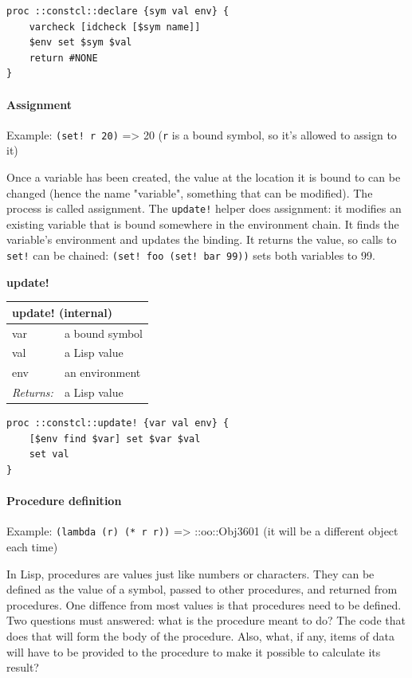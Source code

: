 \documentclass[twoside,9pt]{report}
\begin{document}
\noindent\makebox[\linewidth]{\rule{\linewidth}{0.4pt}}
\begin{lstlisting}
proc ::constcl::declare {sym val env} {
    varcheck [idcheck [$sym name]]
    $env set $sym $val
    return #NONE
}
\end{lstlisting}
\noindent\makebox[\linewidth]{\rule{\linewidth}{0.4pt}}
\paragraph{Assignment}
\label{assignment}

Example: \texttt{(set! r 20)} => 20 (\texttt{r} is a bound symbol, so it's allowed to assign to it)


Once a variable has been created, the value at the location it is bound to can be changed (hence the name "variable", something that can be modified). The process is called assignment. The \texttt{update!} helper does assignment: it modifies an existing variable that is bound somewhere in the environment chain. It finds the variable's environment and updates the binding. It returns the value, so calls to \texttt{set!} can be chained: \texttt{(set! foo (set! bar 99))} sets both variables to 99.


\textbf{update!}

\begin{tabular}{ |l l| }
\hline
\multicolumn{2}{|l|}{update! (internal)} \\
\hline
var & a bound symbol \\
val & a Lisp value \\
env & an environment \\
\textit{Returns:} & a Lisp value \\
\hline
\end{tabular}

\noindent\makebox[\linewidth]{\rule{\linewidth}{0.4pt}}
\begin{lstlisting}
proc ::constcl::update! {var val env} {
    [$env find $var] set $var $val
    set val
}
\end{lstlisting}
\noindent\makebox[\linewidth]{\rule{\linewidth}{0.4pt}}
\paragraph{Procedure definition}
\label{procedure-definition}

Example: \texttt{(lambda (r) (* r r))} => ::oo::Obj3601 (it will be a different object each time)


In Lisp, procedures are values just like numbers or characters. They can be defined as the value of a symbol, passed to other procedures, and returned from procedures. One diffence from most values is that procedures need to be defined. Two questions must answered: what is the procedure meant to do? The code that does that will form the body of the procedure. Also, what, if any, items of data will have to be provided to the procedure to make it possible to calculate its result?
\end{document}
